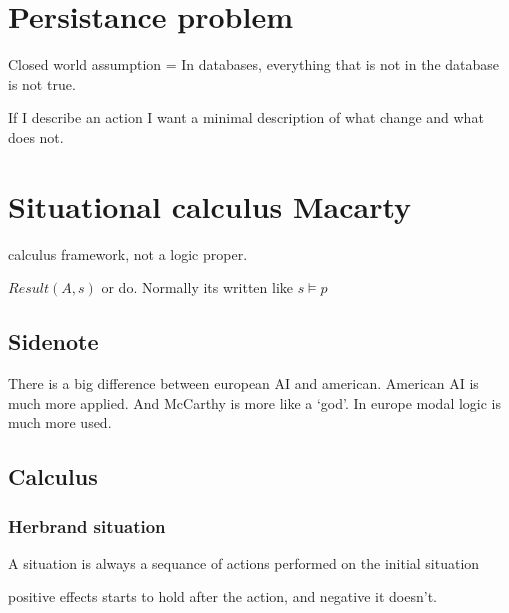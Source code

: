 \documentclass{article}
\begin{document}
\begin{prooftree}
\end{prooftree}
\begin{prooftree}
\end{prooftree}

\section{Persistance problem}
Closed world assumption = In databases, everything that is not in the
database is not true.

If I describe an action I want a minimal description of what change
and what does not.

\section{Situational calculus Macarty}
calculus framework, not a logic proper.

$Result(A,s)$ or do. Normally its written like $s\vDash p$

\subsection{Sidenote}
There is a big difference between european AI and american.
American AI is much more applied. And McCarthy is more like a `god'.
In europe modal logic is much more used.

\subsection{Calculus}
\subsubsection{Herbrand situation}
A situation is always a sequance of actions performed on the initial situation

positive effects starts to hold after the action, and negative it doesn't.
\end{document}
